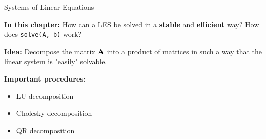 \documentclass[11pt,compress,t,notes=noshow, xcolor=table]{beamer}
\begin{document}
\begin{vbframe}{Systems of Linear Equations}
\lz

\textbf{In this chapter:} How can a LES be solved in a \textbf{stable} and \textbf{efficient} way? How does \texttt{solve(A, b)} work?

\lz

\textbf{Idea:} Decompose the matrix $\mathbf{A}$ into a product of matrices in such a way that the linear system is "easily" solvable.

\lz

\textbf{Important procedures: }

\begin{itemize}
\item LU decomposition
\item Cholesky decomposition
\item QR decomposition
\end{itemize}

\end{vbframe}
\end{document}
